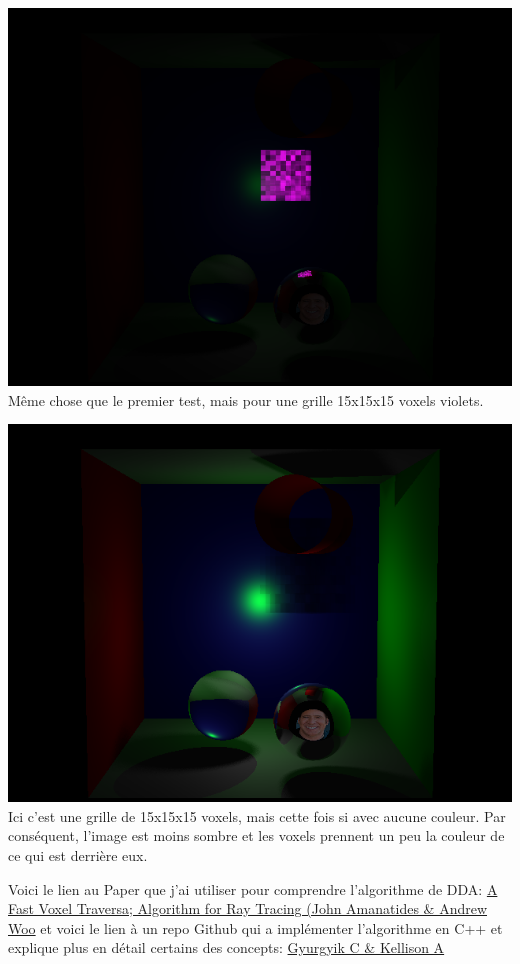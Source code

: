 \documentclass{article}
\begin{document}
\begin{center}
    \includegraphics[scale = 0.5]{Images/SecondTest.png} \\
    Même chose que le premier test, mais pour une grille 15x15x15 voxels violets.
\end{center}
\begin{center}
    \includegraphics[scale = 0.5]{Images/TroisiemeTest.png} \\
    Ici c'est une grille de 15x15x15 voxels, mais cette fois si avec aucune couleur. Par conséquent,
    l'image est moins sombre et les voxels prennent un peu la couleur de ce qui est derrière eux.
\end{center}
Voici le lien au Paper que j'ai utiliser pour comprendre l'algorithme de DDA:
\href{http://www.cse.yorku.ca/~amana/research/grid.pdf}{A Fast Voxel Traversa;
Algorithm for Ray Tracing (John Amanatides \& Andrew Woo} et voici le lien à un repo Github qui a implémenter
l'algorithme en C++ et explique plus en détail certains des concepts:
\href{https://github.com/cgyurgyik/fast-voxel-traversal-algorithm/blob/master/overview/FastVoxelTraversalOverview.md}
{Gyurgyik C \& Kellison A}
\end{document}
